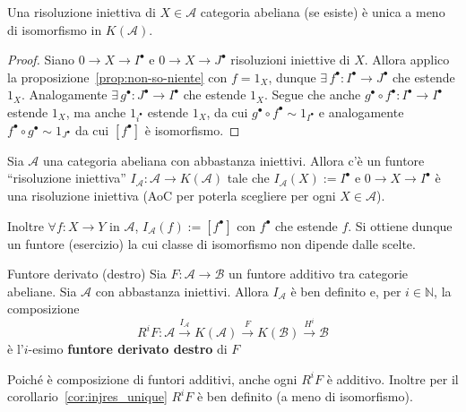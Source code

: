 \begin{corollary}{}\label{cor:injres_unique}
    Una risoluzione iniettiva di \(X \in \mathcal{A}\) categoria abeliana (se
    esiste) è unica a meno di isomorfismo in \(K{(\mathcal{A})}\).
\end{corollary}
\begin{proof}{}
    Siano \(0 \to X \to I^\bullet\) e \(0 \to X \to J^\bullet\) risoluzioni
    iniettive di \(X\). Allora applico la proposizione~\ref{prop:non-so-niente}
    con \(f = 1_X\), dunque \(\exists \, f^\bullet : I^\bullet \to J^\bullet\)
    che estende \(1_X\). Analogamente \(\exists \, g^\bullet : J^\bullet \to
    I^\bullet\) che estende \(1_X\). Segue che anche \(g^\bullet \circ f^\bullet
    : I^\bullet \to I^\bullet\) estende \(1_X\), ma anche \(1_{i^\bullet} \)
    estende \(1_X\), da cui \(g^\bullet \circ f^\bullet \sim 1_{I^\bullet} \) e
    analogamente \(f^\bullet \circ g^\bullet \sim 1_{J^\bullet} \) da cui
    \([f^\bullet]\) è isomorfismo.
\end{proof}

\begin{corollary}{}
    Sia \(\mathcal{A}\) una categoria abeliana con abbastanza iniettivi. Allora
    c'è un funtore ``risoluzione iniettiva'' \(I_\mathcal{A} : \mathcal{A} \to
    K(\mathcal{A})\) tale che \(I_{\mathcal{A}} {(X)} := I^\bullet\) e \(0 \to X
    \to I^\bullet\) è una risoluzione iniettiva (AoC per poterla scegliere per
    ogni \(X \in \mathcal{A}\)).

    Inoltre \(\forall f : X \to Y\) in \(\mathcal{A}\), \(I_{\mathcal{A}} {(f)}
    := [f^\bullet]\) con \(f^\bullet\) che estende \(f\). Si ottiene dunque un
    funtore (esercizio) la cui classe di isomorfismo non dipende dalle scelte.
\end{corollary}

\begin{definition}{Funtore derivato (destro)}
    Sia \(F : \mathcal{A} \to \mathcal{B}\) un funtore additivo tra categorie
    abeliane. Sia \(\mathcal{A}\) con abbastanza iniettivi. Allora
    \(I_\mathcal{A}\) è ben definito e, per \(i \in \mathbb{N}\), la composizione 
    \[
      R^{i}F : \mathcal{A} \overset{I_\mathcal{A}}{\to} K{(\mathcal{A})}
      \overset{F}{\to} K{(\mathcal{B})} \overset{H^{i}}{\to} \mathcal{B}
    \]
    è l'\(i\)-esimo \textbf{funtore derivato destro} di \(F\) 
\end{definition}
\begin{remark}{}
    Poiché è composizione di funtori additivi, anche ogni \(R^{i}F\) è additivo.
    Inoltre per il corollario~\ref{cor:injres_unique} \(R^{i}F\) è ben definito
    (a meno di isomorfismo).
\end{remark}


